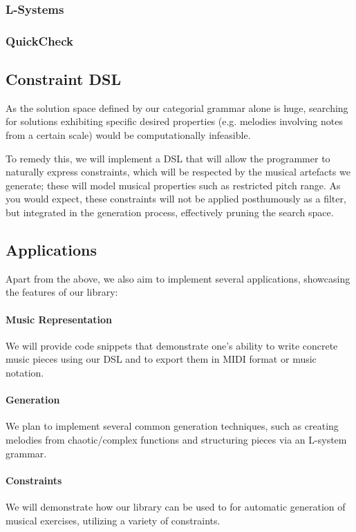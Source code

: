 \documentclass[12pt,a4paper]{article}
\begin{document}
\subsubsection{L-Systems}
\cite{lsystem}
\subsubsection{QuickCheck}

\subsection{Constraint DSL}
As the solution space defined by our categorial grammar alone is huge, searching for solutions exhibiting specific desired properties (e.g. melodies involving notes from a certain scale) would be computationally infeasible.

To remedy this, we will implement a DSL that will allow the programmer to naturally express constraints, which will be respected by the musical artefacts we generate; these will model musical properties such as restricted pitch range. As you would expect, these constraints will not be applied posthumously as a filter, but integrated in the generation process, effectively pruning the search space.

\subsection{Applications}
Apart from the above, we also aim to implement several applications, showcasing the features of our library:
\vspace{-15pt}
\paragraph{Music Representation} We will provide code snippets that demonstrate one's ability to write concrete music pieces using our DSL and to export them in MIDI format or music notation.
\vspace{-15pt}
\paragraph{Generation} We plan to implement several common generation techniques, such as creating melodies from 
chaotic/complex functions and structuring pieces via an L-system grammar.
\vspace{-15pt}
\paragraph{Constraints} We will demonstrate how our library can be used to for automatic generation of musical exercises, utilizing a variety of constraints.
\vspace{5pt}
\end{document}
